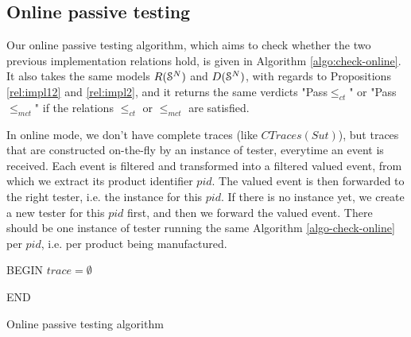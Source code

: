 \subsection{Online passive testing}
\label{sec:testing:online}

Our online passive testing algorithm, which aims to check whether
the two previous implementation relations hold, is given in
Algorithm \ref{algo:check-online}. It also takes the same models
$R(\EuScript{S}^{N})$ and $D(\EuScript{S}^{N})$, with regards to
Propositions \ref{rel:impl12} and \ref{rel:impl2}, and it returns
the same verdicts "Pass$\leq_{ct}$" or "Pass$\leq_{mct}$" if the
relations $\leq_{ct}$ or $\leq_{mct}$ are satisfied.

In online mode, we don't have complete traces (like
$CTraces({Sut})$), but traces that are constructed on-the-fly by
an instance of tester, everytime an event is received. Each event
is filtered and transformed into a filtered valued event, from
which we extract its product identifier $pid$. The valued event
is then forwarded to the right tester, i.e. the instance for this
$pid$. If there is no instance yet, we create a new tester for
this $pid$ first, and then we forward the valued event. There
should be one instance of tester running the same Algorithm
\ref{algo-check-online} per $pid$, i.e. per product being
manufactured.



\begin{algorithm}[h]


    BEGIN\;
    $trace = \emptyset$\;


    END\;

    \caption{Online passive testing algorithm}
    \label{algo:check-online}
\end{algorithm}
